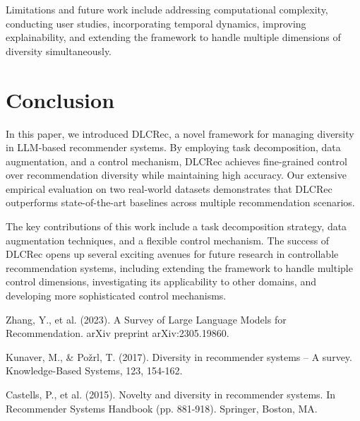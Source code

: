 \documentclass[12pt,letterpaper]{article}
\begin{document}
Limitations and future work include addressing computational complexity, conducting user studies, incorporating temporal dynamics, improving explainability, and extending the framework to handle multiple dimensions of diversity simultaneously.

\section{Conclusion}

In this paper, we introduced DLCRec, a novel framework for managing diversity in LLM-based recommender systems. By employing task decomposition, data augmentation, and a control mechanism, DLCRec achieves fine-grained control over recommendation diversity while maintaining high accuracy. Our extensive empirical evaluation on two real-world datasets demonstrates that DLCRec outperforms state-of-the-art baselines across multiple recommendation scenarios.

The key contributions of this work include a task decomposition strategy, data augmentation techniques, and a flexible control mechanism. The success of DLCRec opens up several exciting avenues for future research in controllable recommendation systems, including extending the framework to handle multiple control dimensions, investigating its applicability to other domains, and developing more sophisticated control mechanisms.


\begin{thebibliography}{99}

Zhang, Y., et al. (2023). A Survey of Large Language Models for Recommendation. arXiv preprint arXiv:2305.19860.

Kunaver, M., & Požrl, T. (2017). Diversity in recommender systems – A survey. Knowledge-Based Systems, 123, 154-162.

Castells, P., et al. (2015). Novelty and diversity in recommender systems. In Recommender Systems Handbook (pp. 881-918). Springer, Boston, MA.

\end{thebibliography}
\end{document}
